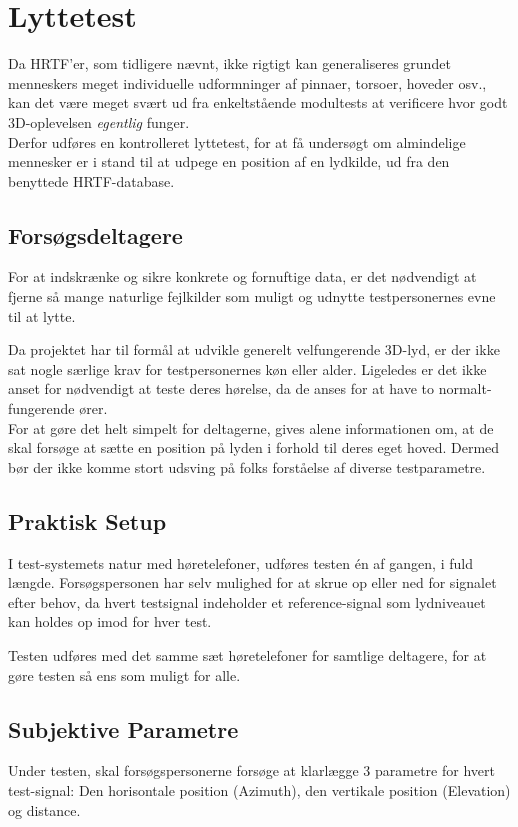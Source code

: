 \section{Lyttetest}
Da HRTF'er, som tidligere nævnt, ikke rigtigt kan generaliseres grundet menneskers meget individuelle udformninger af pinnaer, torsoer, hoveder osv., kan det være meget svært ud fra enkeltstående modultests at verificere hvor godt 3D-oplevelsen \textit{egentlig} funger.\\
Derfor udføres en kontrolleret lyttetest, for at få undersøgt om almindelige mennesker er i stand til at udpege en position af en lydkilde, ud fra den benyttede HRTF-database.  

\subsection{Forsøgsdeltagere}

For at indskrænke og sikre konkrete og fornuftige data, er det nødvendigt at fjerne så mange naturlige fejlkilder som muligt og udnytte testpersonernes evne til at lytte. 

Da projektet har til formål at udvikle generelt velfungerende 3D-lyd, er der ikke sat nogle særlige krav for testpersonernes køn eller alder. Ligeledes er det ikke anset for nødvendigt at teste deres hørelse, da de anses for at have to normalt-fungerende ører. \\
For at gøre det helt simpelt for deltagerne, gives alene informationen om, at de skal forsøge at sætte en position på lyden i forhold til deres eget hoved. Dermed bør der ikke komme stort udsving på folks forståelse af diverse testparametre. 

\subsection{Praktisk Setup}

I test-systemets natur med høretelefoner, udføres testen én af gangen, i fuld længde. Forsøgspersonen har selv mulighed for at skrue op eller ned for signalet efter behov, da hvert testsignal indeholder et reference-signal som lydniveauet kan holdes op imod for hver test. 

Testen udføres med det samme sæt høretelefoner for samtlige deltagere, for at gøre testen så ens som muligt for alle.

\subsection{Subjektive Parametre}
Under testen, skal forsøgspersonerne forsøge at klarlægge 3 parametre for hvert test-signal: Den horisontale position (Azimuth), den vertikale position (Elevation) og distance. 

